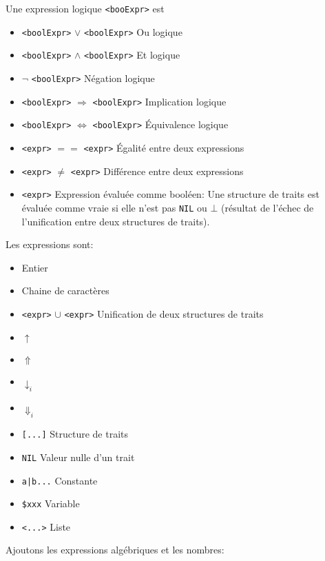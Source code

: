 \documentclass[11pt]{article}
\begin{document}
\begin{itemize}
Une expression logique \verb#<booExpr># est

     \begin{itemize}
    \item \verb#<boolExpr>#  $\lor$ \verb#<boolExpr># Ou logique
    \item \verb#<boolExpr>#  $\land$ \verb#<boolExpr># Et logique
    \item $\neg$ \verb#<boolExpr># Négation logique
    \item \verb#<boolExpr>#  $\Rightarrow$ \verb#<boolExpr>#
      Implication logique
    \item \verb#<boolExpr>#  $\Leftrightarrow$ \verb#<boolExpr>#
      Équivalence logique
    \item \verb#<expr>#  $==$ \verb#<expr># Égalité entre deux expressions
    \item \verb#<expr>#  $\neq$ \verb#<expr># Différence entre deux expressions
    \item \verb#<expr># Expression évaluée comme booléen: Une
      structure de traits est évaluée comme vraie si elle n'est pas
      \verb#NIL# ou $\bot$ (résultat de l'échec de l'unification
      entre deux structures de traits).
    \end{itemize}

Les expressions sont:

     \begin{itemize}
    \item Entier
    \item Chaine de caractères
    \item \verb#<expr>#  $\cup$ \verb#<expr># Unification de deux
      structures de traits
    \item $\uparrow$
    \item $\Uparrow$
    \item $\downarrow_i$
    \item $\Downarrow_i$
    \item \verb#[...]# Structure de traits
    \item \verb#NIL# Valeur nulle d'un trait
    \item \verb#a|b...# Constante
    \item \verb#$xxx# Variable
    \item \verb#<...># Liste
    \end{itemize}
    
Ajoutons les expressions algébriques et les nombres:


\end{itemize}
\end{document}
